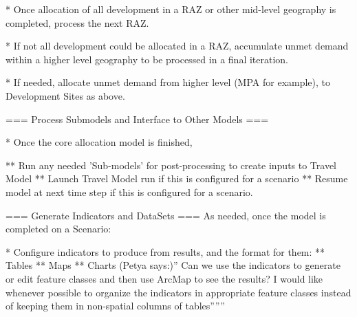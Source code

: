* Once allocation of all development in a RAZ or other mid-level geography is completed, process the next RAZ.

* If not all development could be allocated in a RAZ, accumulate unmet demand within a higher level geography to be processed in a final iteration.

* If needed, allocate unmet demand from higher level (MPA for example), to Development Sites as above.

=== Process Submodels and Interface to Other Models ===

* Once the core allocation model is finished,

** Run any needed 'Sub-models' for post-processing to create inputs to Travel Model
** Launch Travel Model run if this is configured for a scenario
** Resume model at next time step if this is configured for a scenario.

=== Generate Indicators and DataSets ===
As needed, once the model is completed on a Scenario:

* Configure indicators to produce from results, and the format for them:
** Tables
** Maps
** Charts
(Petya says:)'' Can we use the indicators to generate or edit feature classes and then use ArcMap to see the results? I would like whenever possible to organize the indicators in appropriate feature classes instead of keeping them in non-spatial columns of tables''''''

